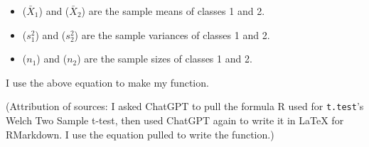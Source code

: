 \documentclass[
  letterpaper,
  DIV=11,
  numbers=noendperiod]{scrartcl}
\providecommand{\tightlist}{%
  \setlength{\itemsep}{0pt}\setlength{\parskip}{0pt}}\usepackage{longtable,booktabs,array}
\begin{document}
\begin{itemize}
\tightlist
\item
  (\(\bar{X}_1\)) and (\(\bar{X}_2\)) are the sample means of classes 1
  and 2.
\item
  (\(s_1^2\)) and (\(s_2^2\)) are the sample variances of classes 1 and
  2.
\item
  (\(n_1\)) and (\(n_2\)) are the sample sizes of classes 1 and 2.
\end{itemize}

I use the above equation to make my function.

(Attribution of sources: I asked ChatGPT to pull the formula R used for
\texttt{t.test}'s Welch Two Sample t-test, then used ChatGPT again to
write it in LaTeX for RMarkdown. I use the equation pulled to write the
function.)
\end{document}
